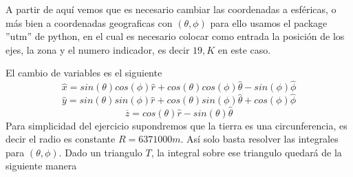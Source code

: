 \documentclass[20pt]{report}
\begin{document}
\begin{itemize}
A partir de aqu\'i vemos que es necesario cambiar las coordenadas a esf\'ericas, o  m\'as bien a coordenadas geograficas con $(\theta,\phi)$ para ello usamos  el package ''utm'' de python, en el cual es necesario  colocar como entrada la posici\'on de los ejes, la zona y el numero indicador, es decir $19,K$ en este caso.

El cambio de variables es el siguiente
\[\hat{x}=sin(\theta)cos(\phi)\hat{r}+cos(\theta)cos(\phi)\hat{\theta}-sin(\phi)\hat{\phi} \]
\[\hat{y}=sin(\theta)sin(\phi)\hat{r}+cos(\theta)sin(\phi)\hat{\theta}+cos(\phi)\hat{\phi} \]
\[\overline{z}=cos(\theta)\hat{r}-sin(\theta) \hat{\theta}\]
Para simplicidad del ejercicio supondremos que la tierra es una circunferencia, es decir el radio es constante $R=6371000m$. As\'i solo basta resolver las integrales para $(\theta,\phi)$.
Dado un triangulo $T$, la integral sobre ese triangulo quedar\'a de la siguiente manera


\end{itemize}
\end{document}
